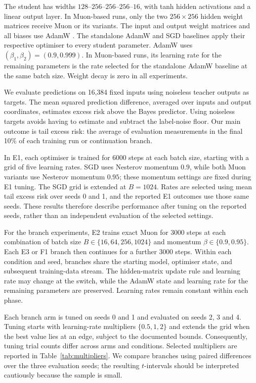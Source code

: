 \documentclass[11pt,a4paper]{article}
\begin{document}
The student has widths $128$--$256$--$256$--$256$--$16$, with tanh hidden activations and a linear output layer. In Muon-based runs, only the two $256\times256$ hidden weight matrices receive Muon or its variants. The input and output weight matrices and all biases use AdamW \citep{loshchilov2019adamw}. The standalone AdamW and SGD baselines apply their respective optimiser to every student parameter. AdamW uses $(\beta_1,\beta_2)=(0.9,0.999)$. In Muon-based runs, its learning rate for the remaining parameters is the rate selected for the standalone AdamW baseline at the same batch size. Weight decay is zero in all experiments.

We evaluate predictions on 16,384 fixed inputs using noiseless teacher outputs as targets. The mean squared prediction difference, averaged over inputs and output coordinates, estimates excess risk above the Bayes predictor. Using noiseless targets avoids having to estimate and subtract the label-noise floor. Our main outcome is tail excess risk: the average of evaluation measurements in the final 10\% of each training run or continuation branch.

In E1, each optimiser is trained for 6000 steps at each batch size, starting with a grid of five learning rates. SGD uses Nesterov momentum $0.9$, while both Muon variants use Nesterov momentum $0.95$; these momentum settings are fixed during E1 tuning. The SGD grid is extended at $B=1024$. Rates are selected using mean tail excess risk over seeds 0 and 1, and the reported E1 outcomes use those same seeds. These results therefore describe performance after tuning on the reported seeds, rather than an independent evaluation of the selected settings.

For the branch experiments, E2 trains exact Muon for 3000 steps at each combination of batch size $B\in\{16,64,256,1024\}$ and momentum $\beta\in\{0.9,0.95\}$. Each E3 or F1 branch then continues for a further 3000 steps. Within each condition and seed, branches share the starting model, optimiser state, and subsequent training-data stream. The hidden-matrix update rule and learning rate may change at the switch, while the AdamW state and learning rate for the remaining parameters are preserved. Learning rates remain constant within each phase.

Each branch arm is tuned on seeds 0 and 1 and evaluated on seeds 2, 3 and 4. Tuning starts with learning-rate multipliers $\{0.5,1,2\}$ and extends the grid when the best value lies at an edge, subject to the documented bounds. Consequently, tuning trial counts differ across arms and conditions. Selected multipliers are reported in Table~\ref{tab:multipliers}. We compare branches using paired differences over the three evaluation seeds; the resulting $t$-intervals should be interpreted cautiously because the sample is small.
\end{document}
